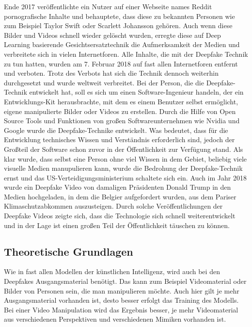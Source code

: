 Ende 2017 veröffentlichte ein Nutzer auf einer Webseite names Reddit pornografische Inhalte und behauptete, dass diese zu bekannten Personen wie zum Beispiel Taylor Swift oder Scarlett Johansson gehören.
Auch wenn diese Bilder und Videos schnell wieder gelöscht wurden, erregte diese auf Deep Learning basierende Gesichtsersatztechnik die Aufmerksamkeit der Medien und verbreitete sich in vielen Internetforen.
Alle Inhalte, die mit der Deepfake Technik zu tun hatten, wurden am 7. Februar 2018 auf fast allen Internetforen entfernt und verboten.
Trotz des Verbots hat sich die Technik dennoch weiterhin durchgesetzt und wurde weltweit verbreitet.
Bei der Person, die die Deepfake-Technik entwickelt hat, soll es sich um einen Software-Ingenieur handeln, der ein Entwicklungs-Kit herausbrachte, mit dem es einem Benutzer selbst ermöglicht, eigene manipulierte Bilder oder Videos zu erstellen.
Durch die Hilfe von Open Source Tools und Funktionen von großen Softwareunternehmen wie Nvidia und Google wurde die Deepfake-Technike entwickelt. Was bedeutet, dass für die Entwicklung technisches Wissen und Verständnis erforderlich sind, jedoch der Großteil der Software schon zuvor in der Öffentlichkeit zur Verfügung stand.
Als klar wurde, dass selbst eine Person ohne viel Wissen in dem Gebiet, beliebig viele visuelle Medien manupulieren kann, wurde die Bedrohung der Deepfake-Technik ernst und das US-Verteidigungsministerium schaltete sich ein.
Auch im Jahr 2018 wurde ein Deepfake Video von damaligen Präsidenten Donald Trump in den Medien hochgeladen, in dem die Belgier aufgefordert wurden, aus dem Pariser Klimaschutzabkommen auszusteigen.\newline
Durch solche Veröffentlichungen der Deepfake Videos zeigte sich, dass die Technologie sich schnell weiterentwickelt und in der Lage ist einen großen Teil der Öffentlichkeit täuschen zu können.\cite{Jatit}

\subsection{Theoretische Grundlagen}
Wie in fast allen Modellen der künstlichen Intelligenz, wird auch bei den Deepfakes Ausgangsmaterial benötigt. Das kann zum Beispiel Videomaterial oder Bilder von Personen sein, die man manipulieren möchte. Auch hier gilt je mehr Ausgangsmaterial vorhanden ist, desto besser erfolgt das Training des Modells. Bei einer Video Manipulation wird das Ergebnis besser, je mehr Videomaterial aus verschiedenen Perspektiven und verschiedenen Mimiken vorhanden ist.\cite{HochschuleDerMedien}\newline
